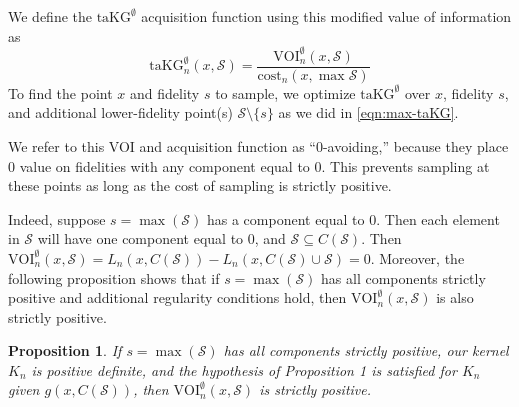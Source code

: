 \documentclass[letterpaper]{article}
\newcommand{\VOIE}{\text{VOI}^\emptyset}
\newcommand{\taKGE}{\text{taKG}^\emptyset}
\newtheorem{proposition}{Proposition}
\numberwithin{equation}{section}
\renewcommand{\S}{\mathcal{S}}
\newcommand{\loss}{L}
\begin{document}

We define the $\taKGE$ acquisition function using this modified value of information as
\begin{equation}
\taKGE_n(x, \mathcal{S}) = \frac{\VOIE_n(x,\S)}{\text{cost}_n(x , \max \S)}
\label{eqn:takg0}
\end{equation}
To find the point $x$ and fidelity $s$ to sample, we optimize $\taKGE$ over 
$x$, fidelity $s$, and additional lower-fidelity point(s) $\S \setminus \{s\}$ as we did in \eqref{eqn:max-taKG}.

We refer to this VOI and acquisition function as ``0-avoiding,'' because they place 0 value on fidelities with any component equal to 0. 
This prevents sampling at these points as long as the cost of sampling is strictly positive.

Indeed, suppose $s=\max(\S)$ has a component equal to $0$.  Then 
each element in $\S$ will have one component equal to $0$, and $\S \subseteq C(\S)$.
Then $\VOIE_n(x,\S) = \loss_n(x,C(\S)) - \loss_n(x,C(\S)\cup \S) = 0$.
Moreover, the following proposition shows that if $s=\max(\S)$ has all components strictly positive and additional regularity conditions hold, then $\VOIE_n(x,\S)$ is also strictly positive.

\begin{proposition}
If $s=\max(\S)$ has all components strictly positive, our kernel $K_n$ is positive definite, and the hypothesis of Proposition 1 is satisfied for $K_n$ given $g(x,C(\S))$, then $\VOIE_n(x,\S)$ is strictly positive.
\end{proposition}
\end{document}
